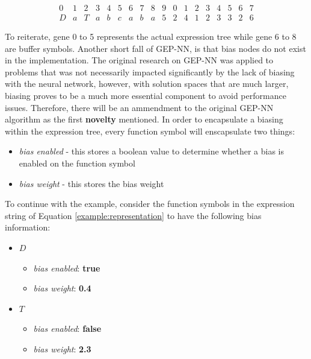 \begin{equation}\label{example:representation}
    \begin{array}{cccccccccccccccccc}
        0 & 1 & 2 & 3 & 4 & 5 & 6 & 7 & 8 & 9 & 0 & 1 & 2 & 3 & 4 & 5 & 6 & 7 \\
        D & a & T & a & b & c & a & b & a & 5 & 2 & 4 & 1 & 2 & 3 & 3 & 2 & 6
    \end{array}
\end{equation}

\noindent To reiterate, gene 0 to 5 represents the actual expression tree while gene 6 to 8 are buffer symbols. Another short fall of GEP-NN, is that bias nodes do not exist in the implementation. The original research on GEP-NN was applied to problems that was not necessarily impacted significantly by the lack of biasing with the neural network, however, with solution spaces that are much larger, biasing proves to be a much more essential component to avoid performance issues. Therefore, there will be an ammendment to the original GEP-NN algorithm as the first \textbf{novelty} mentioned. In order to encapsulate a biasing within the expression tree, every function symbol will enscapsulate two things:

\begin{itemize}
    \item \textit{bias enabled} - this stores a boolean value to determine whether a bias is enabled on the function symbol
    \item \textit{bias weight} - this stores the bias weight
\end{itemize}


\noindent To continue with the example, consider the function symbols in the expression string of Equation \ref{example:representation} to have the following bias information:
\begin{itemize}
    \item $D$
    \begin{itemize}
        \item \textit{bias enabled}: \textbf{true}
        \item \textit{bias weight}: \textbf{0.4}
    \end{itemize}

    \item $T$
    \begin{itemize}
        \item \textit{bias enabled}: \textbf{false}
        \item \textit{bias weight}: \textbf{2.3}
    \end{itemize}
\end{itemize}


